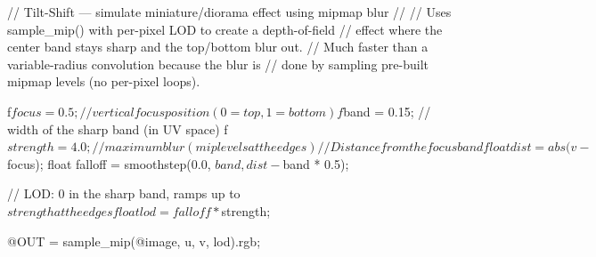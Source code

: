 // Tilt-Shift — simulate miniature/diorama effect using mipmap blur
//
// Uses sample_mip() with per-pixel LOD to create a depth-of-field
// effect where the center band stays sharp and the top/bottom blur out.
// Much faster than a variable-radius convolution because the blur is
// done by sampling pre-built mipmap levels (no per-pixel loops).

f$focus = 0.5;     // vertical focus position (0 = top, 1 = bottom)
f$band = 0.15;     // width of the sharp band (in UV space)
f$strength = 4.0;  // maximum blur (mip levels at the edges)

// Distance from the focus band
float dist = abs(v - $focus);
float falloff = smoothstep(0.0, $band, dist - $band * 0.5);

// LOD: 0 in the sharp band, ramps up to $strength at the edges
float lod = falloff * $strength;

@OUT = sample_mip(@image, u, v, lod).rgb;
